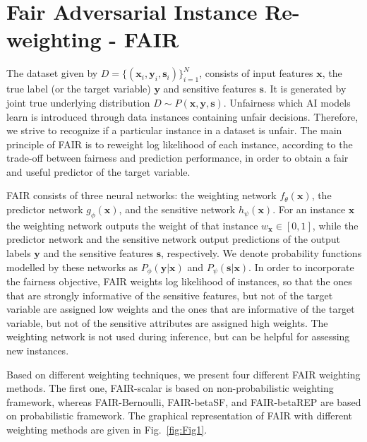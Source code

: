\documentclass[preprint,12pt]{elsarticle}
\begin{document}
\section{Fair Adversarial Instance Re-weighting - FAIR}
\label{Sec:FAIR}

The dataset given by $D=\{(\mathbf{x}_i, \mathbf{y}_i, \mathbf{s}_i) \}_{i=1}^N$, consists of input features $\mathbf{x}$, the true label (or the target variable) $\mathbf{y}$ and sensitive features $\mathbf{s}$. It is generated by joint true underlying distribution $D \sim P(\mathbf{x},\mathbf{y},\mathbf{s})$. Unfairness which AI models learn is introduced through data instances containing unfair decisions. Therefore, we strive to recognize if a particular instance in a dataset is unfair. The main principle of FAIR is to reweight log likelihood of each instance, according to the trade-off between fairness and prediction performance, in order to obtain a fair and useful predictor of the target variable.

FAIR consists of three neural networks: the weighting network $f_\theta(\mathbf{x})$, the predictor network $g_\phi(\mathbf{x})$, and the sensitive network $h_\psi(\mathbf{x})$.
For an instance $\mathbf{x}$ the weighting network outputs the weight of that instance $w_\mathbf{x}\in[0,1]$, while the predictor network and the sensitive network output predictions of the output labels $\mathbf{y}$ and the sensitive features $\mathbf{s}$, respectively. We denote probability functions modelled by these networks as $P_\phi(\mathbf{y}|\mathbf{x})$ and $P_\psi(\mathbf{s}|\mathbf{x})$.
In order to incorporate the fairness objective, FAIR weights log likelihood of instances, so that the ones that are strongly informative of the sensitive features, but not of the target variable are assigned low weights and the ones that are informative of the target variable, but not of the sensitive attributes are assigned high weights.
The weighting network is not used during inference, but can be helpful for assessing new instances.

Based on different weighting techniques, we present four different FAIR weighting methods. The first one, FAIR-scalar is based on non-probabilistic weighting framework, whereas FAIR-Bernoulli, FAIR-betaSF, and FAIR-betaREP are based on probabilistic framework. The graphical representation of FAIR with different weighting methods are given in Fig.~\ref{fig:Fig1}.
\end{document}
